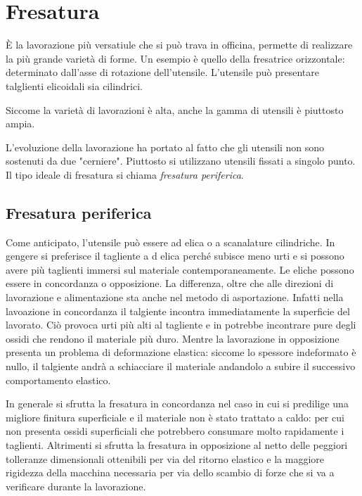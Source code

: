 \section{Fresatura}
È la lavorazione più versatiule che si può trava in officina, permette di realizzare la più grande varietà 
di forme.
Un esempio è quello della fresatrice orizzontale: determinato dall'asse di rotazione dell'utensile.
L'utensile può presentare talglienti elicoidali sia cilindrici.

Siccome la varietà di lavorazioni è alta, anche la gamma di utensili è piuttosto ampia.

L'evoluzione della lavorazione ha portato al fatto che gli utensili non sono sostenuti da due "cerniere".
Piuttosto si utilizzano utensili fissati a singolo punto.
Il tipo ideale di fresatura si chiama \emph{fresatura periferica}.

\subsection{Fresatura periferica}
Come anticipato, l'utensile può essere ad elica o a scanalature cilindriche. In gengere si preferisce 
il tagliente a d elica perché subisce meno urti e si possono avere più taglienti immersi sul materiale
contemporaneamente. 
Le eliche possono essere in concordanza o opposizione.
La differenza, oltre che alle direzioni di lavorazione e alimentazione sta anche nel metodo di asportazione.
Infatti nella lavoazione in concordanza il talgiente incontra immediatamente la superficie del lavorato.
Ciò provoca urti più alti al tagliente e in potrebbe incontrare pure degli ossidi che rendono il materiale
più duro.
Mentre la lavorazione in opposizione presenta un problema di deformazione elastica: siccome lo spessore 
indeformato è nullo, il talgiente andrà a schiacciare il materiale andandolo a subire il successivo 
comportamento elastico.

In generale si sfrutta la fresatura in concordanza nel caso in cui si predilige una migliore finitura 
superficiale e il materiale non è stato trattato a caldo: per cui non presenta ossidi superficiali che 
potrebbero consumare molto rapidamente i taglienti.
Altrimenti si sfrutta la fresatura in opposizione al netto delle peggiori tolleranze dimensionali ottenibili 
per via del ritorno elastico e la maggiore rigidezza della macchina necessaria per via dello scambio di 
forze che si va a verificare durante la lavorazione.

